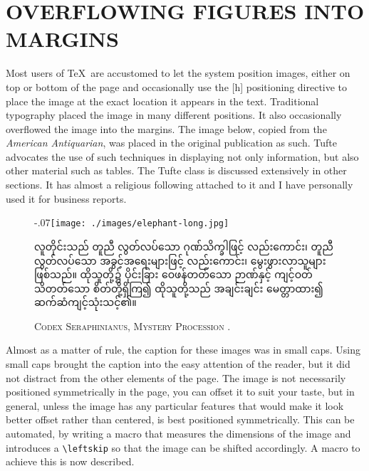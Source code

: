 \chapter[Overflowing Figures into Margins]{OVERFLOWING FIGURES INTO MARGINS}

Most users of \TeX\ are accustomed to let the system position images, either on top or bottom of the page and occasionally use the [h] positioning directive to place the image at the exact location it appears in the text. Traditional typography placed the image in many different positions. It also occasionally overflowed the image into the margins. The image below, copied from the \textit{American Antiquarian}, was placed in the original publication as such. Tufte advocates the use of such techniques in displaying not only information, but also other material such as tables. The Tufte class is discussed extensively in other sections. It has almost a religious following attached to it and I have personally used it for business reports.\citep{seraphini}

\begin{figure}[htbp]
\leftskip-.07\textwidth\texttt{[image: ./images/elephant-long.jpg]}\par

\begin{multicols}{3}
\protect\myanmar

လူတိုင်းသည် တူညီ လွတ်လပ်သော ဂုဏ်သိက္ခါဖြင့် လည်းကောင်း၊ တူညီလွတ်လပ်သော အခွင့်အရေးများဖြင့် လည်းကောင်း၊ မွေးဖွားလာသူများ ဖြစ်သည်။ ထိုသူတို့၌ ပိုင်းခြား ဝေဖန်တတ်သော ဉာဏ်နှင့် ကျင့်ဝတ် သိတတ်သော စိတ်တို့ရှိကြ၍ ထိုသူတို့သည် အချင်းချင်း မေတ္တာထား၍ ဆက်ဆံကျင့်သုံးသင့်၏။
\end{multicols}
\centerline{\protect\textsc{Codex Seraphinianus, Mystery Procession \protect\citep{seraphini}}.}
\end{figure}

Almost as a matter of rule, the caption for these images was in small caps. Using small caps brought the caption into the easy attention of the reader, but it did not distract from the other elements of the page.
The image is not necessarily positioned symmetrically in the page, you can offset it to suit your taste, but in general, unless the image has any particular features that would make it look better offset rather than centered, is best positioned symmetrically. This can be automated, by writing a macro that measures the dimensions of the image and introduces a \verb+\leftskip+ so that the image can be shifted accordingly. A macro to achieve this is now described.



